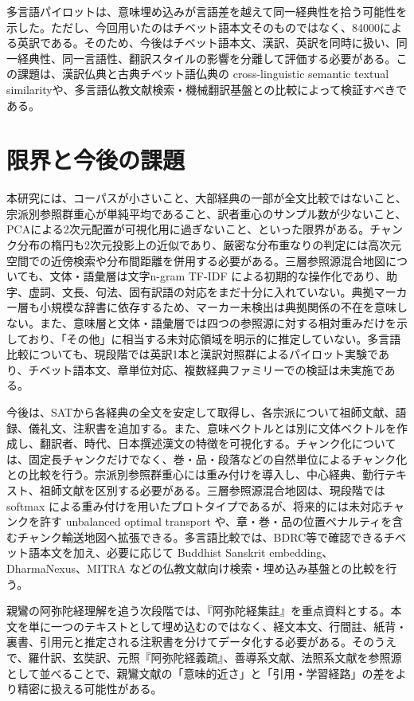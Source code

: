 \documentclass[uplatex,dvipdfmx,11pt,a4paper]{jsarticle}
\begin{document}
多言語パイロットは、意味埋め込みが言語差を越えて同一経典性を拾う可能性を示した。ただし、今回用いたのはチベット語本文そのものではなく、84000による英訳である。そのため、今後はチベット語本文、漢訳、英訳を同時に扱い、同一経典性、同一言語性、翻訳スタイルの影響を分離して評価する必要がある。この課題は、漢訳仏典と古典チベット語仏典の cross-linguistic semantic textual similarity\cite{felbur2022}や、多言語仏教文献検索・機械翻訳基盤\cite{mitra2026}との比較によって検証すべきである。

\section{限界と今後の課題}

本研究には、コーパスが小さいこと、大部経典の一部が全文比較ではないこと、宗派別参照群重心が単純平均であること、訳者重心のサンプル数が少ないこと、PCAによる2次元配置が可視化用に過ぎないこと、といった限界がある。チャンク分布の楕円も2次元投影上の近似であり、厳密な分布重なりの判定には高次元空間での近傍検索や分布間距離を併用する必要がある。三層参照源混合地図についても、文体・語彙層は文字n-gram TF-IDF による初期的な操作化であり、助字、虚詞、文長、句法、固有訳語の対応をまだ十分に入れていない。典拠マーカー層も小規模な辞書に依存するため、マーカー未検出は典拠関係の不在を意味しない。また、意味層と文体・語彙層では四つの参照源に対する相対重みだけを示しており、「その他」に相当する未対応領域を明示的に推定していない。多言語比較についても、現段階では英訳1本と漢訳対照群によるパイロット実験であり、チベット語本文、章単位対応、複数経典ファミリーでの検証は未実施である。

今後は、SATから各経典の全文を安定して取得し、各宗派について祖師文献、語録、儀礼文、注釈書を追加する。また、意味ベクトルとは別に文体ベクトルを作成し、翻訳者、時代、日本撰述漢文の特徴を可視化する。チャンク化については、固定長チャンクだけでなく、巻・品・段落などの自然単位によるチャンク化との比較を行う。宗派別参照群重心には重み付けを導入し、中心経典、勤行テキスト、祖師文献を区別する必要がある。三層参照源混合地図は、現段階では softmax による重み付けを用いたプロトタイプであるが、将来的には未対応チャンクを許す unbalanced optimal transport や、章・巻・品の位置ペナルティを含むチャンク輸送地図へ拡張できる。多言語比較では、BDRC等で確認できるチベット語本文を加え、必要に応じて Buddhist Sanskrit embedding、DharmaNexus、MITRA などの仏教文献向け検索・埋め込み基盤との比較を行う。

親鸞の阿弥陀経理解を追う次段階では、『阿弥陀経集註』を重点資料とする。本文を単に一つのテキストとして埋め込むのではなく、経文本文、行間註、紙背・裏書、引用元と推定される注釈書を分けてデータ化する必要がある。そのうえで、羅什訳、玄奘訳、元照『阿弥陀経義疏』、善導系文献、法照系文献を参照源として並べることで、親鸞文献の「意味的近さ」と「引用・学習経路」の差をより精密に扱える可能性がある。
\end{document}
